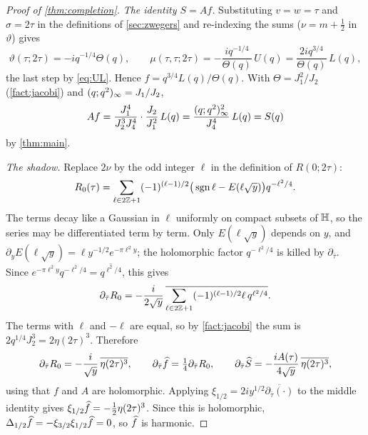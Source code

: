 \begin{proof}[Proof of \cref{thm:completion}]
\emph{The identity $S=Af$.} Substituting $v=w=\tau$ and $\sigma=2\tau$ in the
definitions of \cref{sec:zwegers} and re-indexing the sums ($\nu=m+\frac12$ in
$\vartheta$) gives
\[
\vartheta(\tau;2\tau)=-iq^{-1/4}\Theta(q),\qquad
\mu(\tau,\tau;2\tau)=-\frac{iq^{-1/4}}{\Theta(q)}\,U(q)=\frac{2iq^{3/4}}{\Theta(q)}\,L(q),
\]
the last step by \eqref{eq:UL}. Hence $f=q^{3/4}L(q)/\Theta(q)$. With
$\Theta=J_1^2/J_2$ (\cref{fact:jacobi}) and $(q;q^2)_{\infty}=J_1/J_2$,
\[
A f=\frac{J_1^4}{J_2^3J_4^4}\cdot\frac{J_2}{J_1^2}\,L(q)
=\frac{(q;q^2)_{\infty}^2}{J_4^4}\,L(q)=S(q)
\]
by \cref{thm:main}.

\emph{The shadow.} Replace $2\nu$ by the odd integer $\ell$ in the definition of
$R(0;2\tau)$:
\[
R_0(\tau)=\sum_{\ell\in2\mathbb{Z}+1}(-1)^{(\ell-1)/2}\big(\operatorname{sgn}\ell-E(\ell\sqrt y)\big)q^{-\ell^2/4}.
\]
The terms decay like a Gaussian in $\ell$ uniformly on compact subsets of
$\mathbb{H}$, so the series may be differentiated term by term. Only $E(\ell\sqrt y)$
depends on $y$, and $\partial_yE(\ell\sqrt y)=\ell y^{-1/2}e^{-\pi\ell^2y}$;
the holomorphic factor $q^{-\ell^2/4}$ is killed by $\partial_{\bar\tau}$. Since
$e^{-\pi\ell^2y}q^{-\ell^2/4}=\overline{q^{\ell^2/4}}$, this gives
\[
\partial_{\bar\tau}R_0=-\frac{i}{2\sqrt y}\,
\overline{\sum_{\ell\in2\mathbb{Z}+1}(-1)^{(\ell-1)/2}\ell\,q^{\ell^2/4}} .
\]
The terms with $\ell$ and $-\ell$ are equal, so by \cref{fact:jacobi} the sum
is $2q^{1/4}J_2^3=2\eta(2\tau)^3$. Therefore
\begin{equation}\label{eq:dR}
\partial_{\bar\tau}R_0=-\frac{i}{\sqrt y}\,\overline{\eta(2\tau)^3},\qquad
\partial_{\bar\tau}\widehat{f}=\tfrac14\partial_{\bar\tau}R_0,\qquad
\partial_{\bar\tau}\widehat{S}=-\frac{iA(\tau)}{4\sqrt y}\,\overline{\eta(2\tau)^3},
\end{equation}
using that $f$ and $A$ are holomorphic. Applying $\xi_{1/2}=2iy^{1/2}\overline{\partial_{\bar\tau}(\cdot)}$
to the middle identity gives $\xi_{1/2}\widehat{f}=-\frac12\eta(2\tau)^3$. Since this is
holomorphic, $\Delta_{1/2}\widehat{f}=-\xi_{3/2}\xi_{1/2}\widehat{f}=0$, so $\widehat{f}$ is harmonic.


\end{proof}
